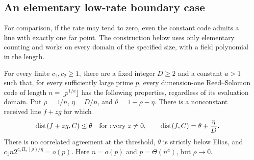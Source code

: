 \subsection{An elementary low-rate boundary case}
\label{sec:vanishing-rate}

For comparison, if the rate may tend to zero, even the constant code
admits a line with exactly one far point. The construction below uses
only elementary counting and works on every domain of the specified
size, with a field polynomial in the length.

\begin{theorem}
\label{fg:punctured-line}
For every finite $c_1,c_2\ge1$, there are a fixed integer $D\ge2$ and
a constant $a>1$ such that, for every sufficiently large prime $p$,
every dimension-one Reed--Solomon code of length
$n=\lfloor p^{1/a}\rfloor$ has the following properties, regardless
of its evaluation domain.
Put $\rho=1/n$, $\eta=D/n$, and $\theta=1-\rho-\eta$.
There is a nonconstant received line $f+zg$ for which
\[
 \operatorname{dist}(f+zg,C)\le\theta\quad\text{for every }z\ne0,
 \qquad \operatorname{dist}(f,C)=\theta+\frac\eta D.
\]
There is no correlated agreement at the threshold, $\theta$ is strictly
below Elias, and $c_1n2^{c_2H_2(\rho)/\eta}=o(p)$.
Here $n=o(p)$ and $p=\Theta(n^a)$, but $\rho\to0$.
\end{theorem}
